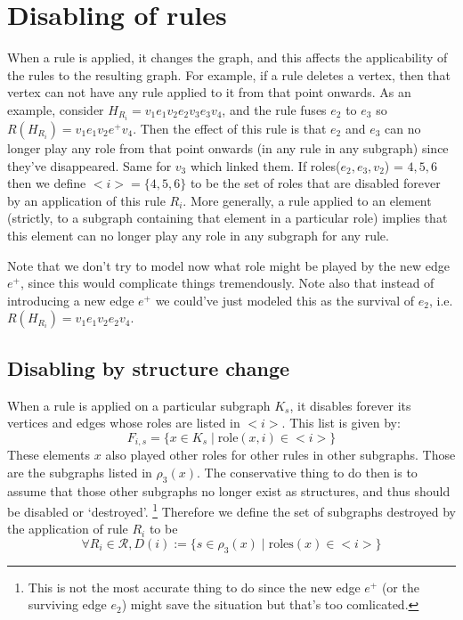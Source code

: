\documentclass[11pt, oneside, reqno]{article}
\newcommand{\Rc}{\mathcal{R}}
\begin{document}
\section{Disabling of rules}
\label{disablingOfRules}
When a rule is applied, it changes the graph, and this affects the applicability of the rules to the resulting graph. 
For example, if a rule deletes a vertex, then that vertex can not have any rule applied to it from that point onwards. 
As an example, consider $H_{R_i} = v_1e_1v_2e_2v_3e_3v_4$, and the rule fuses $e_2$ to $e_3$ so $R(H_{R_i}) = v_1e_1v_2e^+v_4$.
Then the effect of this rule is that $e_2$ and $e_3$ can no longer play any role from that point onwards (in any rule in any subgraph) since they've disappeared. 
Same for $v_3$ which linked them.
If roles($e_2,e_3,v_2$) = $4,5,6$ then we define $<i> = \{4,5,6\}$ to be the set of roles that are disabled forever by an application of this rule $R_i$.
More generally, a rule applied to an element (strictly, to a subgraph containing that element in a particular role) implies that this element can no longer play any role in any subgraph for any rule.

Note that we don't try to model now what role might be played by the new edge $e^+$, since this would complicate things tremendously.
Note also that instead of introducing a new edge $e^+$ we could've just modeled this as the survival of $e_2$, i.e. $R(H_{R_i}) = v_1e_1v_2e_2v_4$. 

\subsection{Disabling by structure change}
When a rule is applied on a particular subgraph $K_s$, it disables forever its vertices and edges whose roles are listed in $<i>$.
This list is given by:
\[F_{i,s} = \{x \in K_s \;|\; \textrm{role}(x,i) \in <i>\}\]
These elements $x$ also played other roles for other rules in other subgraphs.
Those are the subgraphs listed in $\rho_3(x)$.
The conservative thing to do then is to assume that those other subgraphs no longer exist as structures, and thus should be disabled or `destroyed'.
\footnote{This is not the most accurate thing to do since the new edge $e^+$ (or the surviving edge $e_2$) might save the situation but that's too comlicated.}
Therefore we define the set of subgraphs destroyed by the application of rule $R_i$ to be 
\begin{equation}
\label{eq:Di}
\forall R_i \in \Rc, D(i) := \{s \in \rho_3(x) \;|\; \text{roles}(x) \in <i>\}
\end{equation}
\end{document}
